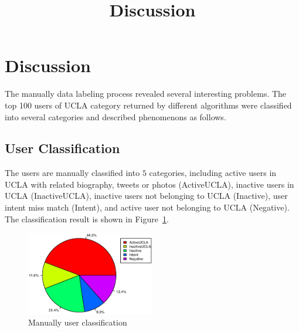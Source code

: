 \documentclass{article}
\begin{document}
\title{Discussion}
\maketitle \else \fi


\section{Discussion}\label{sec:discussion}
The manually data labeling process revealed several interesting problems. The top 100 users of UCLA category returned by different algorithms were classified into several categories and described phenomenons as follows.

\subsection{User Classification}
The users are manually classified into $5$ categories, including active users in UCLA with related biography, tweets or photos (ActiveUCLA), inactive users in UCLA (InactiveUCLA), inactive users not belonging to UCLA (Inactive), user intent miss match (Intent), and active user not belonging to UCLA (Negative). The classification result is shown in Figure~\ref{fig:userclass}.

\begin{figure}[htbp]
\centering
\includegraphics[width=0.5\textwidth]{experiment/uc.eps}
\caption{Manually user classification}
\label{fig:userclass}
\end{figure}
\end{document}
